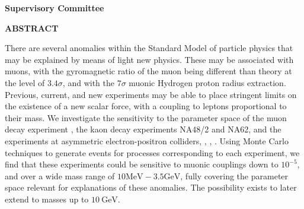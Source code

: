 \newpage
{}

\noindent \textbf{Supervisory Committee}
\tpbreak
\panel

\begin{center}
\textbf{ABSTRACT}
\end{center}

There are several anomalies within the Standard Model of particle physics that may be explained by means of light new physics.
These may be associated with muons, with the gyromagnetic ratio of the muon being different than theory at the level of $3.4\sigma$, and with the $7\sigma$ muonic Hydrogen proton radius extraction.
Previous, current, and new experiments may be able to place stringent limits on the existence of a new scalar force, with a coupling to leptons proportional to their mass.
We investigate the sensitivity to the parameter space of the muon decay experiment \mueee, the kaon decay experiments NA48/2 and NA62, and the experiments at asymmetric electron-positron colliders, \babar, \belle, \belletwo.
Using Monte Carlo techniques to generate events for processes corresponding to each experiment, we find that these experiments could be sensitive to muonic couplings down to $10^{-5}$, and over a wide mass range of $10\textrm{MeV} - 3.5\textrm{GeV}$, fully covering the parameter space relevant for explanations of these anomalies.
The possibility exists to later extend to masses up to $10~\textrm{GeV}$.
